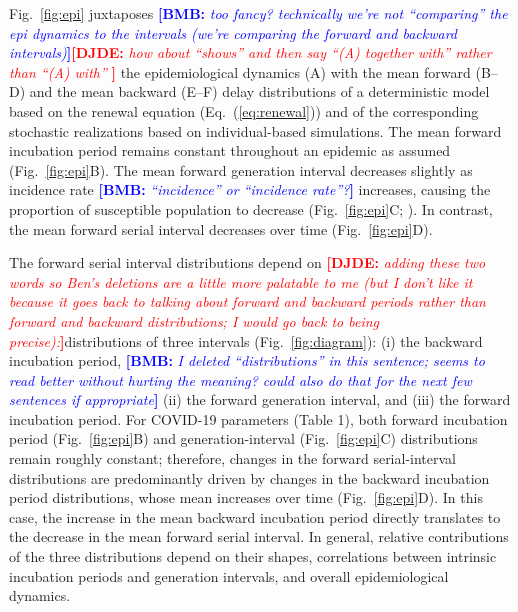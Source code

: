 \documentclass[12pt]{article}
\newcommand{\comment}{\showcomment}
\newcommand{\showcomment}[3]{\textcolor{#1}{\textbf{[#2: }\textsl{#3}\textbf{]}}}
\newcommand{\bmb}[1]{\comment{blue}{BMB}{#1}}
\newcommand{\djde}[1]{\comment{red}{DJDE}{#1}}
\newcommand{\eref}[1]{Eq.~(\ref{eq:#1})}
\newcommand{\fref}[1]{Fig.~\ref{fig:#1}}
\begin{document}
\fref{epi} juxtaposes \bmb{too fancy? technically we're not
  ``comparing'' the epi dynamics to the intervals (we're comparing the
  forward and backward intervals)}\djde{how about ``shows'' and then
  say ``(A) together with'' rather than ``(A) with'' } the epidemiological dynamics (A) with the mean forward (B--D) and the mean backward (E--F) delay distributions of a deterministic model based on the renewal equation (\eref{renewal}) and of the corresponding stochastic realizations based on individual-based simulations.
The mean forward incubation period remains constant throughout an epidemic as assumed (\fref{epi}B).
The mean forward generation interval decreases slightly as incidence rate \bmb{``incidence'' or ``incidence rate''?} increases, causing the proportion of susceptible population to decrease (\fref{epi}C; \cite{kenah2008generation, champredon2015intrinsic}).
In contrast, the mean forward serial interval decreases over time (\fref{epi}D).

The forward serial interval distributions depend on \djde{adding these
two words so Ben's deletions are a little more palatable to me (but I
don't like it because it goes back to talking about forward and
backward periods rather than forward and backward distributions; I
would go back to being precise):}distributions of three intervals
(\fref{diagram}): (i) the backward incubation period, \bmb{I deleted
  ``distributions'' in this sentence; seems to read better without
  hurting the meaning? could also do that for the next few sentences
  if appropriate} (ii) the forward generation interval, and (iii) the forward incubation period.
For COVID-19 parameters (Table 1), both forward incubation period (\fref{epi}B) and generation-interval (\fref{epi}C) distributions remain roughly constant;
therefore, changes in the forward serial-interval distributions are predominantly driven by changes in the backward incubation period distributions, whose mean increases over time (\fref{epi}D).
In this case, the increase in the mean backward incubation period directly translates to the decrease in the mean forward serial interval.
In general, relative contributions of the three distributions depend on their shapes, correlations between intrinsic incubation periods and generation intervals, and overall epidemiological dynamics.
\end{document}
